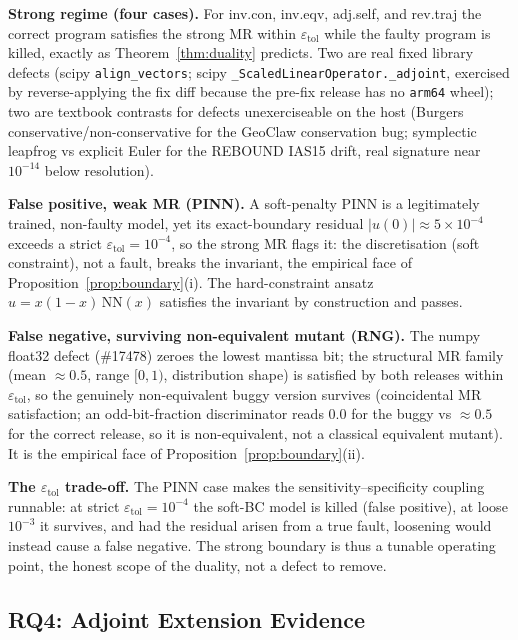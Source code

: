 \documentclass[manuscript,screen,review]{acmart}
\begin{document}
\textbf{Strong regime (four cases).} For inv.con, inv.eqv, adj.self, and
rev.traj the correct program satisfies the strong MR within
$\varepsilon_{\mathrm{tol}}$ while the faulty program is killed, exactly as
Theorem~\ref{thm:duality} predicts. Two are real fixed library defects (scipy
\texttt{align\_vectors}; scipy \texttt{\_ScaledLinearOperator.\_adjoint},
exercised by reverse-applying the fix diff because the pre-fix release has no
\texttt{arm64} wheel); two are textbook contrasts for defects unexerciseable on
the host (Burgers conservative/non-conservative for the GeoClaw conservation
bug; symplectic leapfrog vs explicit Euler for the REBOUND IAS15 drift, real
signature near $10^{-14}$ below resolution).

\textbf{False positive, weak MR (PINN).} A soft-penalty PINN is a legitimately
trained, non-faulty model, yet its exact-boundary residual
$|u(0)| \approx 5\times10^{-4}$ exceeds a strict
$\varepsilon_{\mathrm{tol}} = 10^{-4}$, so the strong MR flags it: the
discretisation (soft constraint), not a fault, breaks the invariant, the
empirical face of Proposition~\ref{prop:boundary}(i). The hard-constraint ansatz
$u = x(1-x)\,\mathrm{NN}(x)$ satisfies the invariant by construction and passes.

\textbf{False negative, surviving non-equivalent mutant (RNG).} The numpy
float32 defect (\#17478) zeroes the lowest mantissa bit; the structural MR
family (mean $\approx 0.5$, range $[0,1)$, distribution shape) is satisfied by
both releases within $\varepsilon_{\mathrm{tol}}$, so the genuinely
non-equivalent buggy version survives (coincidental MR satisfaction; an
odd-bit-fraction discriminator reads $0.0$ for the buggy vs $\approx 0.5$ for the
correct release, so it is non-equivalent, not a classical equivalent mutant).
It is the empirical face of Proposition~\ref{prop:boundary}(ii).

\textbf{The $\varepsilon_{\mathrm{tol}}$ trade-off.} The PINN case makes the
sensitivity--specificity coupling runnable: at strict
$\varepsilon_{\mathrm{tol}} = 10^{-4}$ the soft-BC model is killed (false
positive), at loose $10^{-3}$ it survives, and had the residual arisen from a
true fault, loosening would instead cause a false negative. The strong boundary
is thus a tunable operating point, the honest scope of the duality, not a defect
to remove.

\subsection{RQ4: Adjoint Extension Evidence}\label{rq4-adjoint-extension-arm}
\end{document}
